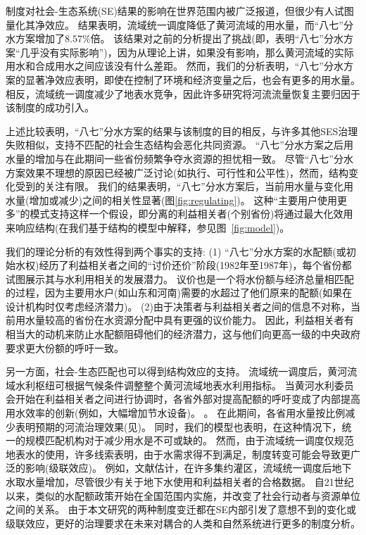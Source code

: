 \label{discussion-1}
制度对社会-生态系统(SE)结果的影响在世界范围内被广泛报道，但很少有人试图量化其净效应\cite{cumming2020a}。
结果表明，流域统一调度降低了黄河流域的用水量，而“八七”分水方案增加了$8.57\%$倍。
该结果对之前的分析提出了挑战(即，表明“八七”分水方案“几乎没有实际影响”)，因为从理论上讲，如果没有影响，那么黄河流域的实际用水和合成用水之间应该没有什么差距\cite{abadie2015,hill2021}。
然而，我们的分析表明，“八七”分水方案的显著净效应表明，即使在控制了环境和经济变量之后，也会有更多的用水量。
相反，流域统一调度减少了地表水竞争，因此许多研究将河流流量恢复主要归因于该制度\cite{chen2021,huangang2002,an2007}的成功引入。

\label{discussion-2}
%
上述比较表明，“八七”分水方案的结果与该制度的目的相反，与许多其他SES治理失败相似，支持不匹配的社会生态结构会恶化共同资源\cite{kellenberg2009,cai2016,barnes2019}。
“八七”分水方案之后用水量的增加与在此期间一些省份频繁争夺水资源的担忧相一致。
尽管“八七”分水方案效果不理想的原因已经被广泛讨论(如执行、可行性和公平性)，然而，结构变化受到的关注有限。
我们的结果表明，“八七”分水方案后，当前用水量与变化用水量(增加或减少)之间的相关性显著(图\ref{fig:regulating})。
这种“主要用户使用更多”的模式支持这样一个假设，即分离的利益相关者(个别省份)将通过最大化效用来响应结构(在我们基于结构的模型中解释，参见图~\ref{fig:model})。

我们的理论分析的有效性得到两个事实的支持:
(1) “八七”分水方案的水配额(或初始水权)经历了利益相关者之间的“讨价还价”阶段(1982年至1987年)\cite{wang2019a, wang2019d}，每个省份都试图展示其与水利用相关的发展潜力。
议价也是一个将水份额与经济总量相匹配的过程，因为主要用水户(如山东和河南)需要的水超过了他们原来的配额(如果在设计机构时仅考虑经济潜力)\cite{zuo2020}。
(2)由于决策者与利益相关者之间的信息不对称，当前用水量较高的省份在水资源分配中具有更强的议价能力。
因此，利益相关者有相当大的动机来防止水配额阻碍他们的经济潜力，这与他们向更高一级的中央政府要求更大份额的呼吁一致\cite{wang2019a, wang2019d}。

\label{discussion-3}
另一方面，社会-生态匹配也可以得到结构效应的支持。
流域统一调度后，黄河流域水利枢纽可根据气候条件调整整个黄河流域地表水利用指标。
当黄河水利委员会开始在利益相关者之间进行协调时，各省外部对提高配额的呼吁变成了内部提高用水效率的创新(例如，大幅增加节水设备)。
\cite{krieger1955, ostrom1990}。
在此期间，各省用水量按比例减少表明预期的河流治理效果(见)。
同时，我们的模型也表明，在这种情况下，统一的规模匹配机构对于减少用水是不可或缺的。
然而，由于流域统一调度仅规范地表水的使用，许多线索表明，由于水需求得不到满足，制度转变可能会导致更广泛的影响(级联效应)。
例如，文献估计，在许多集约灌区，流域统一调度后地下水取水量增加，尽管很少有关于地下水使用和利益相关者的合格数据\cite{sun2022b}。
自21世纪以来，类似的水配额政策开始在全国范围内实施，并改变了社会行动者与资源单位之间的关系。
由于本文研究的两种制度变迁都在SE内部引发了意想不到的变化或级联效应，更好的治理要求在未来对耦合的人类和自然系统进行更多的制度分析。

